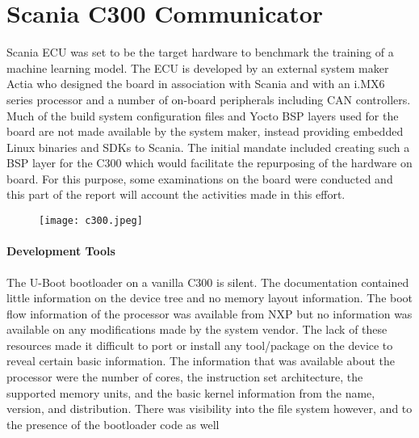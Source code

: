 \chapter{Scania C300 Communicator} \label{rtc-c300}


Scania ECU was set to be the target hardware to benchmark the training of a machine learning model. The ECU is developed by an external system maker Actia who designed the board in association with Scania and with an i.MX6 series processor and a number of on-board peripherals including CAN controllers. Much of the build system configuration files and Yocto BSP layers used for the board are not made available by the system maker, instead providing embedded Linux binaries and SDKs to Scania. The initial mandate included creating such a BSP layer for the C300 which would facilitate the repurposing of the hardware on board. For this purpose, some examinations on the board were conducted and this part of the report will account the activities made in this effort.

\begin{figure}[h]
	\centering
	\texttt{[image: c300.jpeg]}
\end{figure}

\subsubsection*{Development Tools}

The U-Boot bootloader on a vanilla C300 is silent. The documentation contained little information on the device tree and no memory layout information. The boot flow information of the processor was available from NXP but no information was available on any modifications made by the system vendor. The lack of these resources made it difficult to port or install any tool/package on the device to reveal certain basic information. The information that was available about the processor were the number of cores, the instruction set architecture, the supported memory units, and the basic kernel information from the name, version, and distribution. There was visibility into the file system however, and to the presence of the bootloader code as well



